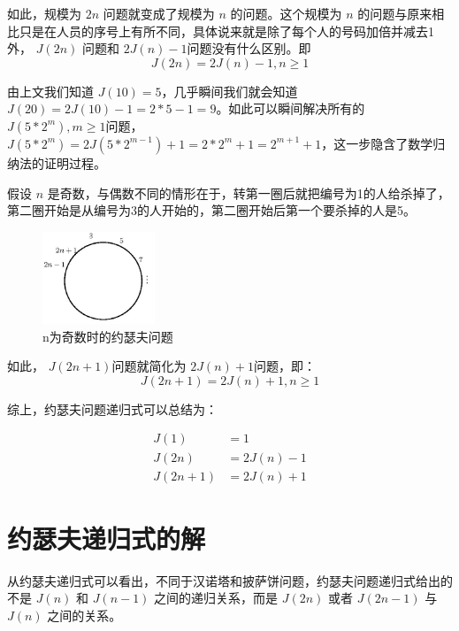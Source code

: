 \documentclass[10pt,a4paper,UTF8]{article}
\begin{document}
如此，规模为 \(2n\) 问题就变成了规模为 \(n\) 的问题。这个规模为 \(n\) 的问题与原来相比只是在人员的序号上有所不同，具体说来就是除了每个人的号码加倍并减去1外， \(J(2n)\) 问题和 \(2J(n) -1\)问题没有什么区别。即
\begin{equation}
\label{eq:1}
J(2n) = 2J(n) -1 , n\ge 1
\end{equation}

由上文我们知道 \(J(10)=5\)，几乎瞬间我们就会知道 \(J(20)= 2J(10)-1= 2*5 -1 = 9\)。如此可以瞬间解决所有的 \(J(5*2^{m}),m\ge 1\)问题， \(J(5*2^{m}) = 2J(5*2^{m-1}) + 1 = 2*2^{m} +1 = 2^{m+1} +1\)，这一步隐含了数学归纳法的证明过程。

假设 \(n\) 是奇数，与偶数不同的情形在于，转第一圈后就把编号为1的人给杀掉了，第二圈开始是从编号为3的人开始的，第二圈开始后第一个要杀掉的人是5。

\begin{figure}[htb]
\centering
\includegraphics[width=0.3\textwidth]{../../img/josephus-n-odd.jpg}
\caption{n为奇数时的约瑟夫问题}
\end{figure}

如此， \(J(2n+1)\)问题就简化为 \(2J(n)+1\)问题，即：
\begin{equation}
\label{eq:2}
J(2n+1) = 2J(n) +1 , n\ge 1
\end{equation}

综上，约瑟夫问题递归式可以总结为：

\begin{equation}
\label{eq:3}
\begin{split}
J(1)&=1 \\
J(2n)&=2J(n) -1 \\
J(2n+1)&=2J(n)+1
\end{split}
\end{equation}

\section{约瑟夫递归式的解}
\label{sec:orgheadline3}


从约瑟夫递归式可以看出，不同于汉诺塔和披萨饼问题，约瑟夫问题递归式给出的不是 \(J(n)\) 和 \(J(n-1)\) 之间的递归关系，而是 \(J(2n)\) 或者 \(J(2n-1)\) 与 \(J(n)\) 之间的关系。
\end{document}
